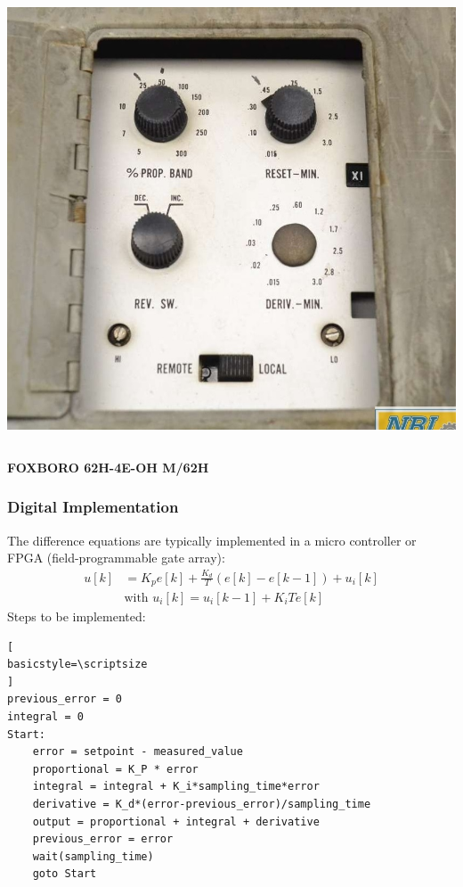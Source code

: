 \begin{frame}
\begin{columns}
\begin{column}{0.5\linewidth}
			\includegraphics[height=0.6\textheight]{img/fb4}
		\end{column}
	\end{columns}
	\begin{center}
		\textbf{FOXBORO 62H-4E-OH M/62H}
	\end{center}
\end{frame}

\begin{frame}[fragile]
	\frametitle{Digital Implementation}
	\small{
	The difference equations are typically implemented in a micro controller or FPGA (field-programmable gate array):
		\begin{align*}
		u[k] &= K_p e[k] + \frac{K_d}{T}(e[k] - e[k-1])+u_i[k] \\
		&\text{with } u_i[k] = u_i[k-1] + K_i T e[k]
		\end{align*}
	Steps to be implemented:}
\begin{lstlisting}[
basicstyle=\scriptsize
]
previous_error = 0
integral = 0
Start:
	error = setpoint - measured_value
	proportional = K_P * error
	integral = integral + K_i*sampling_time*error
	derivative = K_d*(error-previous_error)/sampling_time
	output = proportional + integral + derivative
	previous_error = error
	wait(sampling_time)
	goto Start
	\end{lstlisting}
\end{frame}

